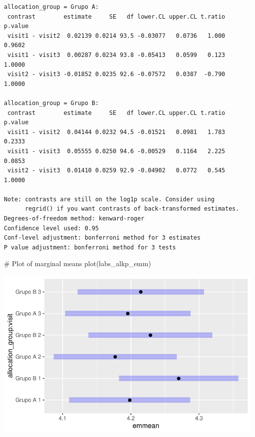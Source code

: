 \documentclass[
  letterpaper,
  DIV=11,
  numbers=noendperiod]{scrartcl}
\newenvironment{Shaded}{\begin{snugshade}}{\end{snugshade}}
\newcommand{\CommentTok}[1]{\textcolor[rgb]{0.37,0.37,0.37}{#1}}
\newcommand{\FunctionTok}[1]{\textcolor[rgb]{0.28,0.35,0.67}{#1}}
\newcommand{\NormalTok}[1]{\textcolor[rgb]{0.00,0.23,0.31}{#1}}
\begin{document}
\begin{verbatim}
allocation_group = Grupo A:
 contrast        estimate     SE   df lower.CL upper.CL t.ratio p.value
 visit1 - visit2  0.02139 0.0214 93.5 -0.03077   0.0736   1.000  0.9602
 visit1 - visit3  0.00287 0.0234 93.8 -0.05413   0.0599   0.123  1.0000
 visit2 - visit3 -0.01852 0.0235 92.6 -0.07572   0.0387  -0.790  1.0000

allocation_group = Grupo B:
 contrast        estimate     SE   df lower.CL upper.CL t.ratio p.value
 visit1 - visit2  0.04144 0.0232 94.5 -0.01521   0.0981   1.783  0.2333
 visit1 - visit3  0.05555 0.0250 94.6 -0.00529   0.1164   2.225  0.0853
 visit2 - visit3  0.01410 0.0259 92.9 -0.04902   0.0772   0.545  1.0000

Note: contrasts are still on the log1p scale. Consider using
      regrid() if you want contrasts of back-transformed estimates. 
Degrees-of-freedom method: kenward-roger 
Confidence level used: 0.95 
Conf-level adjustment: bonferroni method for 3 estimates 
P value adjustment: bonferroni method for 3 tests 
\end{verbatim}

\begin{Shaded}
\begin{Highlighting}[]
\CommentTok{\# Plot of marginal means}
\FunctionTok{plot}\NormalTok{(labs\_alkp\_emm)}
\end{Highlighting}
\end{Shaded}

\includegraphics{Outcomes_V1V2V3_files/figure-pdf/labs_alkp_sens_emm-1.pdf}
\end{document}
